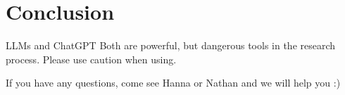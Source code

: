 \documentclass[
	11pt, %
	aspectratio=169, %
]{beamer}
\begin{document}
\section{Conclusion}
\begin{frame}{LLMs and ChatGPT}
    Both are powerful, but dangerous tools in the research process. Please use caution when using. 
    \bigbreak
    
    If you have any questions, come see Hanna or Nathan and we will help you :)
\end{frame}
\end{document}
